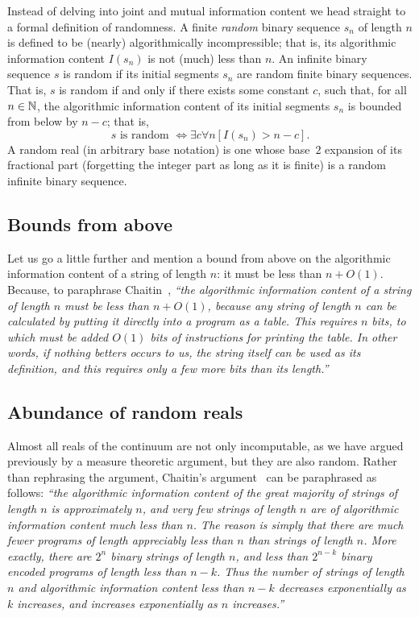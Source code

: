 Instead of delving into joint and mutual information content
we head straight to a formal definition of randomness.
A finite {\em random} binary sequence
$s_n$ of length $n$ is defined to be (nearly) algorithmically incompressible; that is, its algorithmic information content
$I(s_n)$ is not (much) less than $n$.
An infinite binary sequence $s$ is random if its initial segments $s_n$ are random finite binary sequences.
That is, $s$ is random if and only if there exists some constant $c$,
such that, for all $n \in {\Bbb N}$,
 the algorithmic information content of its initial segments $s_n$ is bounded from below by $n-c$; that is,
\begin{equation}
s \textrm{ is random } \Leftrightarrow \exists c \forall n \left[ I(s_n) > n-c \right].
\end{equation}
A random real (in arbitrary base notation) is one whose base~$2$ expansion of its fractional part (forgetting the integer part as long as it is finite)
is a random infinite binary sequence.

\subsection{Bounds from above}

Let us go a little further and mention a bound from above on the algorithmic information content
of a string of length $n$: it must be less than $n+O(1)$.
Because, to paraphrase Chaitin~\cite[p.~11]{Chaitin-1974}, {\em ``the algorithmic information content
of a string of length $n$ must be less than $n+O(1)$,
because any string of length $n$ can be calculated by putting it directly into a program as a table.
This requires $n$ bits, to which must be added $O(1)$ bits of instructions for printing the table.
In other words, if nothing betters occurs to us, the string itself can be used as its definition,
and this requires only a few more bits than its length.''}

\subsection{Abundance of random reals}

Almost all reals of the continuum are not only incomputable, as we have argued previously by a measure theoretic argument,
but they are also random. Rather than rephrasing the argument,  Chaitin's argument~\cite[p.~11]{Chaitin-1974}
can be paraphrased as follows:
{\em ``the algorithmic information content of the great majority of strings of length $n$ is approximately $n$,
and very few strings of length $n$ are of algorithmic information content much less than $n$.
The reason is simply that there are much fewer programs of length appreciably less than $n$ than strings of length $n$.
More exactly, there are $2^n$ binary strings of length $n$, and less than $2^{n-k}$ binary encoded programs of length less than $n-k$.
Thus the number of strings of length $n$ and algorithmic information content less than $n-k$ decreases exponentially as $k$ increases,
and increases exponentially as $n$ increases.''}

